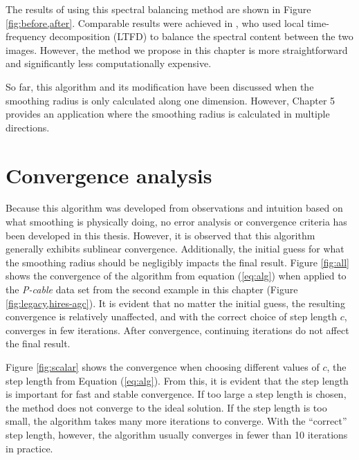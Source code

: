 
        The results of using this spectral balancing method are shown in Figure \ref{fig:before,after}. 
        Comparable results were achieved in \cite{ltft}, who used local time-frequency decomposition (LTFD) to balance the spectral content between the two images. 
        However, the method we propose in this chapter is more straightforward and significantly less computationally expensive.

        So far, this algorithm and its modification have been discussed when the smoothing radius is only calculated along one dimension. 
        However, Chapter 5 provides an application where the smoothing radius is calculated in multiple directions.

        
\section{Convergence analysis}
        Because this algorithm was developed from observations and intuition based on what smoothing is physically doing, no error analysis or convergence criteria has been developed in this thesis.
        However, it is observed that this algorithm generally exhibits sublinear convergence.
        Additionally, the initial guess for what the smoothing radius should be negligibly impacts the final result.
        Figure \ref{fig:all} shows the convergence of the algorithm from equation (\ref{eq:alg}) when applied to the {\em P-cable} data set from the second example in this chapter (Figure \ref{fig:legacy,hires-agc}).
        It is evident that no matter the initial guess, the resulting convergence is relatively unaffected, and with the correct choice of step length $c$, converges in few iterations.
        After convergence, continuing iterations do not affect the final result.

        Figure \ref{fig:scalar} shows the convergence when choosing different values of $c$, the step length from Equation (\ref{eq:alg}).
        From this, it is evident that the step length is important for fast and stable convergence. 
        If too large a step length is chosen, the method does not converge to the ideal solution.
        If the step length is too small, the algorithm takes many more iterations to converge.
        With the ``correct'' step length, however, the algorithm usually converges in fewer than 10 iterations in practice.

